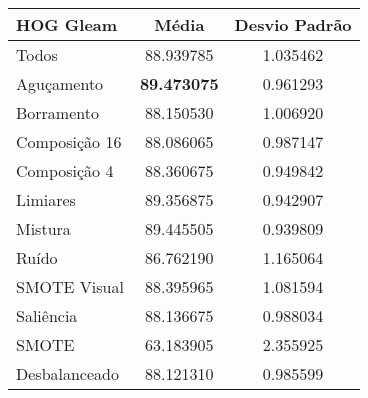

\begin{table}[!htbp]
\centering
\caption{}
\label{tab:resultados:x:melhor}
\begin{tabular}{|l|c|c|}
\hline
\textbf{HOG Gleam} & \textbf{Média}     & \textbf{Desvio Padrão} \\ \hline
   Todos        &  88.939785 &  1.035462  \\ \hline
  Aguçamento    &  \textbf{89.473075} &  0.961293  \\ \hline
  Borramento    &  88.150530 &  1.006920  \\ \hline
  Composição 16 &  88.086065 &  0.987147  \\ \hline
  Composição 4  &  88.360675 &  0.949842  \\ \hline
  Limiares      &  89.356875 &  0.942907  \\ \hline
  Mistura       &  89.445505 &  0.939809  \\ \hline
  Ruído         &  86.762190 &  1.165064  \\ \hline
  SMOTE Visual  &  88.395965 &  1.081594  \\ \hline
  Saliência     &  88.136675 &  0.988034  \\ \hline
 SMOTE          &  63.183905 &  2.355925  \\ \hline
Desbalanceado   &  88.121310 &  0.985599  \\ \hline
\end{tabular}
\end{table}


